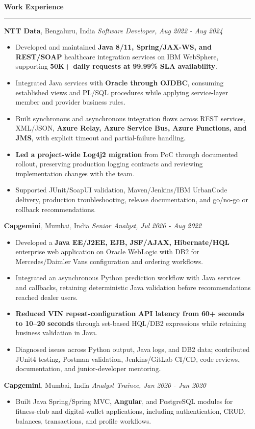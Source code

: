 \documentclass[11pt,letterpaper]{article}
\newcommand{\ressection}[1]{\Needspace{5\baselineskip}\vspace{8pt}\par\textbf{#1}\par\vspace{2pt}\hrule\vspace{5pt}}
\begin{document}
\ressection{Work Experience}
\textbf{NTT Data}, Bengaluru, India \hfill \textit{Software Developer, Aug 2022 - Aug 2024}
\begin{itemize}
  \item Developed and maintained \textbf{Java 8/11, Spring/JAX-WS, and REST/SOAP} healthcare integration services on IBM WebSphere, supporting \textbf{50K+ daily requests at 99.99\% SLA availability}.
  \item Integrated Java services with \textbf{Oracle through OJDBC}, consuming established views and PL/SQL procedures while applying service-layer member and provider business rules.
  \item Built synchronous and asynchronous integration flows across REST services, XML/JSON, \textbf{Azure Relay, Azure Service Bus, Azure Functions, and JMS}, with explicit timeout and partial-failure handling.
  \item \textbf{Led a project-wide Log4j2 migration} from PoC through documented rollout, preserving production logging contracts and reviewing implementation changes with the team.
  \item Supported JUnit/SoapUI validation, Maven/Jenkins/IBM UrbanCode delivery, production troubleshooting, release documentation, and go/no-go or rollback recommendations.
\end{itemize}
\textbf{Capgemini}, Mumbai, India \hfill \textit{Senior Analyst, Jul 2020 - Aug 2022}
\begin{itemize}
  \item Developed a \textbf{Java EE/J2EE, EJB, JSF/AJAX, Hibernate/HQL} enterprise web application on Oracle WebLogic with DB2 for Mercedes/Daimler Vans configuration and ordering workflows.
  \item Integrated an asynchronous Python prediction workflow with Java services and callbacks, retaining deterministic Java validation before recommendations reached dealer users.
  \item \textbf{Reduced VIN repeat-configuration API latency from 60+ seconds to 10--20 seconds} through set-based HQL/DB2 expressions while retaining business validation in Java.
  \item Diagnosed issues across Python output, Java logs, and DB2 data; contributed JUnit4 testing, Postman validation, Jenkins/GitLab CI/CD, code reviews, documentation, and junior-developer mentoring.
\end{itemize}
\textbf{Capgemini}, Mumbai, India \hfill \textit{Analyst Trainee, Jan 2020 - Jun 2020}
\begin{itemize}
  \item Built Java Spring/Spring MVC, \textbf{Angular}, and PostgreSQL modules for fitness-club and digital-wallet applications, including authentication, CRUD, balances, transactions, and profile workflows.
\end{itemize}
\end{document}
